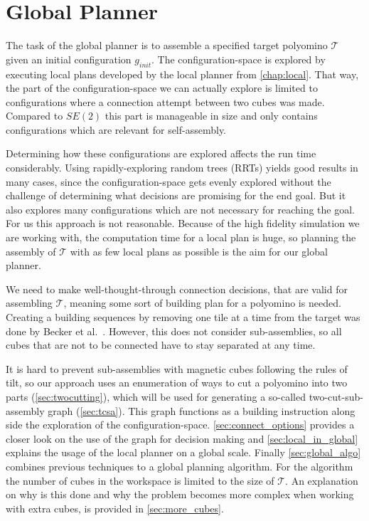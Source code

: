 \chapter{Global Planner}
\label{chap:global}

The task of the global planner is to assemble a specified target polyomino $\mathcal{T}$ given an initial configuration $g_\textit{init}$.
The configuration-space is explored by executing local plans developed by the local planner from \autoref{chap:local}.
That way, the part of the configuration-space we can actually explore is limited to configurations where a connection attempt between two cubes was made.
Compared to $\textit{SE}(2)$ this part is manageable in size and only contains configurations which are relevant for self-assembly.

Determining how these configurations are explored affects the run time considerably.
Using rapidly-exploring random trees (RRTs) \cite{lavalle1998} yields good results in many cases, since the configuration-space gets evenly explored without the challenge of determining what decisions are promising for the end goal.
But it also explores many configurations which are not necessary for reaching the goal.
For us this approach is not reasonable. 
Because of the high fidelity simulation we are working with, the computation time for a local plan is huge, so planning the assembly of $\mathcal{T}$ with as few local plans as possible is the aim for our global planner.

We need to make well-thought-through connection decisions, that are valid for assembling $\mathcal{T}$, meaning some sort of building plan for a polyomino is needed.
Creating a building sequences by removing one tile at a time from the target was done by Becker et al.\ \cite{Becker2020}.
However, this does not consider sub-assemblies, so all cubes that are not to be connected have to stay separated at any time.

It is hard to prevent sub-assemblies with magnetic cubes following the rules of tilt, so our approach uses an enumeration of ways to cut a polyomino into two parts (\autoref{sec:twocutting}), which will be used for generating a so-called two-cut-sub-assembly graph (\autoref{sec:tcsa}).
This graph functions as a building instruction along side the exploration of the configuration-space.
\autoref{sec:connect_options} provides a closer look on the use of the graph for decision making and \autoref{sec:local_in_global} explains the usage of the local planner on a global scale. 
Finally \autoref{sec:global_algo} combines previous techniques to a global planning algorithm.
For the algorithm the number of cubes in the workspace is limited to the size of $\mathcal{T}$.
An explanation on why is this done and why the problem becomes more complex when working with extra cubes, is provided in \autoref{sec:more_cubes}.


